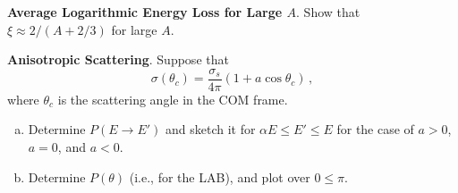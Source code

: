 \begin{exercises}
  \item \textbf{Average Logarithmic Energy Loss for Large $A$}. 
    Show that $\xi \approx 2/(A+2/3)$ for large $A$.
   
  \item \textbf{Anisotropic Scattering}. 
    Suppose that 
    \begin{equation}
       \sigma(\theta_c) = \frac{\sigma_s}{4\pi}(1 + a \cos \theta_c) \, ,
    \end{equation}
    where $\theta_c$ is the scattering angle in the COM frame.  
    \begin{enumerate}[(a)]
     \item Determine $P(E\to E')$ and sketch it for $\alpha E \leq E' \leq E$ for 
           the case of $a > 0$, $a = 0$, and $a < 0$.  
     \item Determine $P(\theta)$ (i.e., for the LAB), and plot over 
           $0 \leq \pi$.
    \end{enumerate}

    
\end{exercises}
